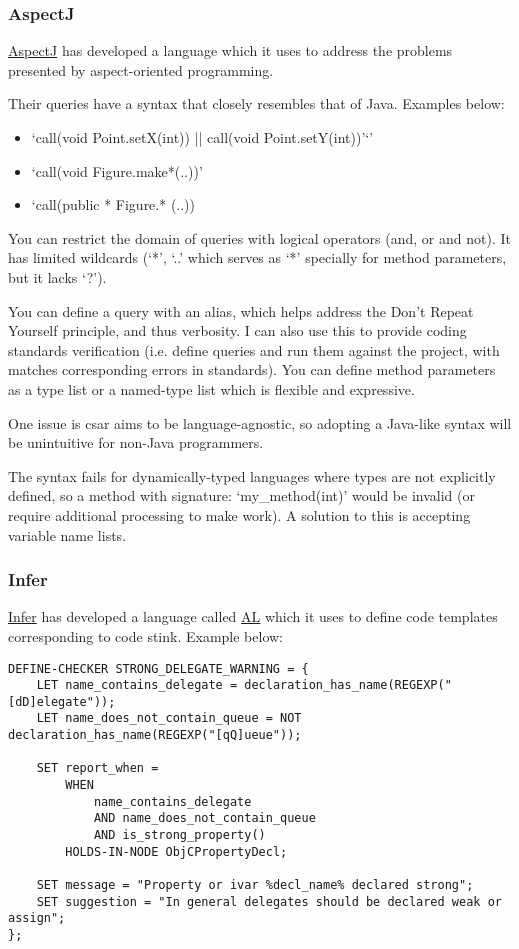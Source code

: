 \documentclass[12pt, letterpaper]{article}
\begin{document}
\subsubsection{AspectJ}
\href{https://eclipse.org/aspectj/doc/next/progguide/starting-aspectj.html}{AspectJ} has developed a language which it uses to address the problems presented by aspect-oriented programming.  

Their queries have a syntax that closely resembles that of Java. Examples below:
\begin{itemize}
    \item `call(void Point.setX(int)) || call(void Point.setY(int))'`'
    \item `call(void Figure.make*(..))'
    \item `call(public * Figure.* (..))
\end{itemize}

You can restrict the domain of queries with logical operators (and, or and not).
It has limited wildcards (`*', `..' which serves as `*' specially for method parameters, but it lacks `?').

You can define a query with an alias, which helps address the Don't Repeat Yourself principle, and thus verbosity.
I can also use this to provide coding standards verification (i.e. define queries and run them against the project, with matches corresponding errors in standards).
You can define method parameters as a type list or a named-type list which is flexible and expressive.

One issue is csar aims to be language-agnostic, so adopting a Java-like syntax will be unintuitive for non-Java programmers.

The syntax fails for dynamically-typed languages where types are not explicitly defined, so a method with signature: `my\_method(int)' would be invalid (or require additional processing to make work).
A solution to this is accepting variable name lists.

\subsubsection{Infer}
\href{https://github.com/facebook/infer}{Infer} has developed a language called \href{https://code.facebook.com/posts/277643589367408/}{AL} which it uses to define code templates corresponding to code stink. Example below:  

\begin{lstlisting}
DEFINE-CHECKER STRONG_DELEGATE_WARNING = {
    LET name_contains_delegate = declaration_has_name(REGEXP("[dD]elegate"));
    LET name_does_not_contain_queue = NOT declaration_has_name(REGEXP("[qQ]ueue"));

    SET report_when =
        WHEN
            name_contains_delegate
            AND name_does_not_contain_queue
            AND is_strong_property()
        HOLDS-IN-NODE ObjCPropertyDecl;

    SET message = "Property or ivar %decl_name% declared strong";
    SET suggestion = "In general delegates should be declared weak or assign";
};
\end{lstlisting}
\end{document}
